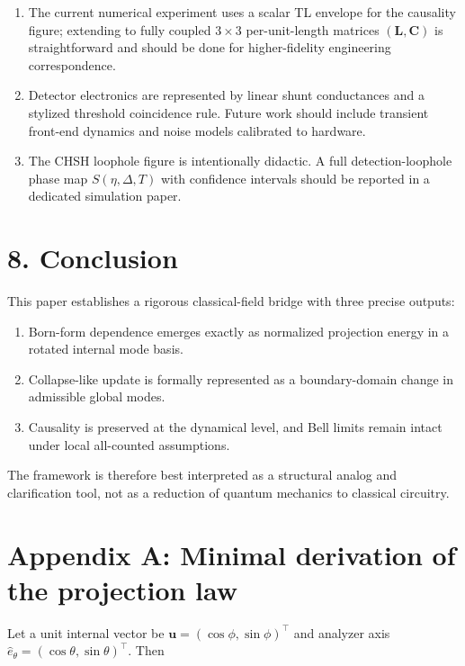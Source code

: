 \documentclass[
  letterpaper,
  DIV=11,
  numbers=noendperiod]{scrartcl}
\providecommand{\tightlist}{%
  \setlength{\itemsep}{0pt}\setlength{\parskip}{0pt}}
\begin{document}
\begin{enumerate}
\def\labelenumi{\arabic{enumi}.}
\tightlist
\item
  The current numerical experiment uses a scalar TL envelope for the
  causality figure; extending to fully coupled \(3\times3\)
  per-unit-length matrices \((\mathbf L,\mathbf C)\) is straightforward
  and should be done for higher-fidelity engineering correspondence.
\item
  Detector electronics are represented by linear shunt conductances and
  a stylized threshold coincidence rule. Future work should include
  transient front-end dynamics and noise models calibrated to hardware.
\item
  The CHSH loophole figure is intentionally didactic. A full
  detection-loophole phase map \(S(\eta,\Delta,T)\) with confidence
  intervals should be reported in a dedicated simulation paper.
\end{enumerate}

\section{8. Conclusion}\label{conclusion}

This paper establishes a rigorous classical-field bridge with three
precise outputs:

\begin{enumerate}
\def\labelenumi{\arabic{enumi}.}
\tightlist
\item
  Born-form dependence emerges exactly as normalized projection energy
  in a rotated internal mode basis.
\item
  Collapse-like update is formally represented as a boundary-domain
  change in admissible global modes.
\item
  Causality is preserved at the dynamical level, and Bell limits remain
  intact under local all-counted assumptions.
\end{enumerate}

The framework is therefore best interpreted as a structural analog and
clarification tool, not as a reduction of quantum mechanics to classical
circuitry.

\section{Appendix A: Minimal derivation of the projection
law}\label{appendix-a-minimal-derivation-of-the-projection-law}

Let a unit internal vector be \(\mathbf u=(\cos\phi,\sin\phi)^\top\) and
analyzer axis \(\hat e_\theta=(\cos\theta,\sin\theta)^\top\). Then
\end{document}
